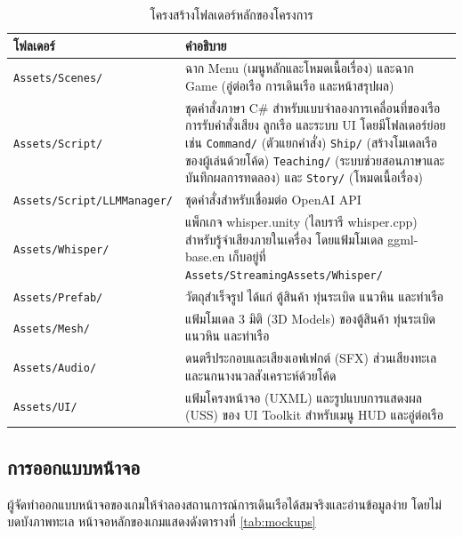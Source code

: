 \begin{table}[!htbp]
\centering
\caption{โครงสร้างโฟลเดอร์หลักของโครงการ}
\label{tab:folder}
\begin{tabular}{|L{4.50cm}|L{9.20cm}|}
\hline
\textbf{โฟลเดอร์} & \textbf{คำอธิบาย} \\
\hline
\texttt{Assets/Scenes/} & ฉาก Menu (เมนูหลักและโหมดเนื้อเรื่อง) และฉาก Game (อู่ต่อเรือ การเดินเรือ และหน้าสรุปผล) \\ \hline
\texttt{Assets/Script/} & ชุดคำสั่งภาษา C\# สำหรับแบบจำลองการเคลื่อนที่ของเรือ การรับคำสั่งเสียง ลูกเรือ และระบบ UI โดยมีโฟลเดอร์ย่อย เช่น \texttt{Command/} (ตัวแยกคำสั่ง) \texttt{Ship/} (สร้างโมเดลเรือของผู้เล่นด้วยโค้ด) \texttt{Teaching/} (ระบบช่วยสอนภาษาและบันทึกผลการทดลอง) และ \texttt{Story/} (โหมดเนื้อเรื่อง) \\ \hline
\texttt{Assets/Script/LLMManager/} & ชุดคำสั่งสำหรับเชื่อมต่อ OpenAI API \\ \hline
\texttt{Assets/Whisper/} & แพ็กเกจ whisper.unity (ไลบรารี whisper.cpp) สำหรับรู้จำเสียงภายในเครื่อง โดยแฟ้มโมเดล ggml-base.en เก็บอยู่ที่ \texttt{Assets/StreamingAssets/Whisper/} \\ \hline
\texttt{Assets/Prefab/} & วัตถุสำเร็จรูป ได้แก่ ตู้สินค้า ทุ่นระเบิด แนวหิน และท่าเรือ \\ \hline
\texttt{Assets/Mesh/} & แฟ้มโมเดล 3 มิติ (3D Models) ของตู้สินค้า ทุ่นระเบิด แนวหิน และท่าเรือ \\ \hline
\texttt{Assets/Audio/} & ดนตรีประกอบและเสียงเอฟเฟกต์ (SFX) ส่วนเสียงทะเลและนกนางนวลสังเคราะห์ด้วยโค้ด \\ \hline
\texttt{Assets/UI/} & แฟ้มโครงหน้าจอ (UXML) และรูปแบบการแสดงผล (USS) ของ UI Toolkit สำหรับเมนู HUD และอู่ต่อเรือ \\
\hline
\end{tabular}
\end{table}

\subsection{การออกแบบหน้าจอ}

ผู้จัดทำออกแบบหน้าจอของเกมให้จำลองสถานการณ์การเดินเรือได้สมจริงและอ่านข้อมูลง่าย โดยไม่บดบังภาพทะเล หน้าจอหลักของเกมแสดงดังตารางที่ \ref{tab:mockups}

